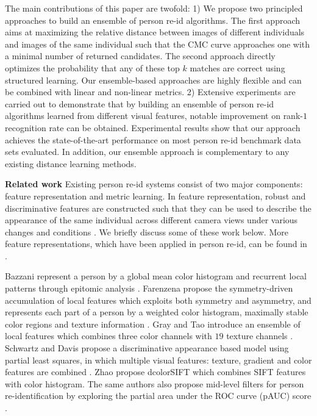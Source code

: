 \documentclass[10pt,twocolumn,letterpaper]{article}
\renewcommand{\paragraph}{\textbf}
\begin{document}
The main contributions of this paper are twofold:
1)
We propose two principled approaches to build an ensemble of
person re-id algorithms.
The first approach aims at
maximizing the relative distance between images of
different individuals and images of the same individual
such that the CMC curve approaches one with a minimal
number of returned candidates.
The second approach directly optimizes the
probability that any of these top $k$ matches
are correct using structured learning.
Our ensemble-based approaches are highly flexible and can be combined with linear
and non-linear metrics.
2)
Extensive experiments are carried out to demonstrate that by building
an ensemble of person re-id algorithms learned from different
visual features, notable improvement on rank-$1$
recognition rate can be obtained.
Experimental results show that
our approach achieves the state-of-the-art performance on most person
re-id benchmark data sets evaluated.
In addition, our ensemble approach is complementary to any existing distance learning methods.







\paragraph{Related work}
Existing person re-id systems consist of two major
components: feature representation and metric learning.
In feature representation, robust and discriminative features are
constructed such that they can be used to describe the appearance
of the same individual across different camera views
under various changes and conditions \cite{Bazzani2012Multiple,
Cheng2011Custom,Farenzena2010Person,
Gheissari2006Person,Gray2008Viewpoint,
Wang2007Shape,Zhao2013Unsupervised,Zhao2014Learning}.
We briefly discuss some of these work below.
More feature representations, which have been
applied in person re-id,
can be found in \cite{Gong2013Person}.

Bazzani \etal represent a person by a global mean
color histogram and recurrent local patterns
through epitomic analysis \cite{Bazzani2012Multiple}.
Farenzena \etal propose the symmetry-driven accumulation
of local features which exploits both symmetry and asymmetry,
and represents each part of a person by a weighted color histogram,
maximally stable color regions and texture information \cite{Farenzena2010Person}.
Gray and Tao introduce an ensemble of local features which combines
three color channels with $19$ texture channels \cite{Gray2008Viewpoint}.
Schwartz and Davis propose a discriminative appearance based model using partial least squares,
in which multiple visual features: texture, gradient and color features
are combined \cite{Schwartz2009Learning}.
Zhao \etal propose dcolorSIFT which combines SIFT features with color histogram.
The same authors also propose mid-level filters for person re-identification
by exploring the partial area under the ROC curve (pAUC) score \cite{Zhao2014Learning}.
\end{document}
